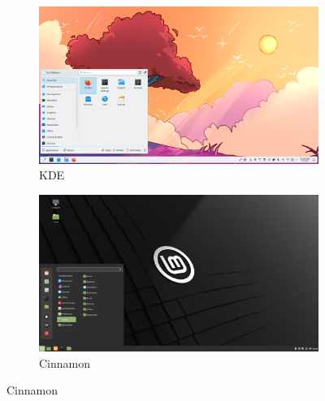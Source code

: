 \documentclass[aspectratio=43]{beamer}
\begin{document}
\begin{frame}{\subsecname}{}
\begin{figure}
            \centering
            \begin{subfigure}{.4\textwidth}
                \centering
                \includegraphics[width=\textwidth]{img/kde.png}
                \caption*{KDE}
            \end{subfigure}
            \begin{subfigure}{.4\textwidth}
                \centering
                \includegraphics[width=\textwidth]{img/cinnamon.png}
                \caption*{Cinnamon}
            \end{subfigure}
        \end{figure}
    \end{frame}

\end{document}
